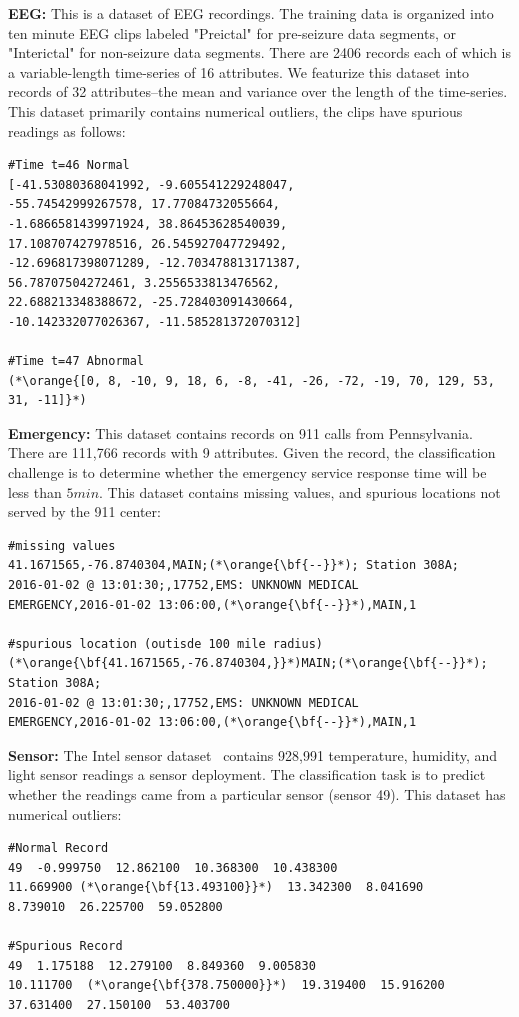 \vspace{0.5em}\noindent\textbf{EEG: } This is a dataset of EEG recordings. 
The training data is organized into ten minute EEG clips labeled "Preictal" for pre-seizure data segments, or "Interictal" for non-seizure data segments. 
There are 2406 records each of which is a variable-length time-series of 16 attributes. We featurize this dataset into records of 32 attributes--the mean and variance over the length of the time-series. 
This dataset primarily contains numerical outliers, the clips have spurious readings as follows:
\begin{lstlisting}
#Time t=46 Normal
[-41.53080368041992, -9.605541229248047, 
-55.74542999267578, 17.77084732055664,
-1.6866581439971924, 38.86453628540039, 
17.108707427978516, 26.545927047729492, 
-12.696817398071289, -12.703478813171387, 
56.78707504272461, 3.2556533813476562, 
22.688213348388672, -25.728403091430664, 
-10.142332077026367, -11.585281372070312]

#Time t=47 Abnormal
(*\orange{[0, 8, -10, 9, 18, 6, -8, -41, -26, -72, -19, 70, 129, 53, 31, -11]}*)
\end{lstlisting}

\vspace{0.5em}\noindent\textbf{Emergency: } This dataset contains records on 911 calls from Pennsylvania. There are 111,766 records with 9 attributes. Given the record, the classification challenge is to determine whether the emergency service response time will be less than $5 min$. This dataset contains missing values, and spurious locations not served by the 911 center:
\begin{lstlisting}
#missing values
41.1671565,-76.8740304,MAIN;(*\orange{\bf{--}}*); Station 308A;
2016-01-02 @ 13:01:30;,17752,EMS: UNKNOWN MEDICAL
EMERGENCY,2016-01-02 13:06:00,(*\orange{\bf{--}}*),MAIN,1

#spurious location (outisde 100 mile radius)
(*\orange{\bf{41.1671565,-76.8740304,}}*)MAIN;(*\orange{\bf{--}}*); Station 308A;
2016-01-02 @ 13:01:30;,17752,EMS: UNKNOWN MEDICAL 
EMERGENCY,2016-01-02 13:06:00,(*\orange{\bf{--}}*),MAIN,1
\end{lstlisting}

\vspace{0.5em}\noindent\textbf{Sensor: } The Intel sensor dataset~\cite{} contains 928,991 temperature, humidity, and light sensor readings a sensor deployment. The classification task is to predict whether the readings came from a particular sensor (sensor 49). This dataset has numerical outliers:
\begin{lstlisting}
#Normal Record
49  -0.999750  12.862100  10.368300  10.438300  
11.669900 (*\orange{\bf{13.493100}}*)  13.342300  8.041690  
8.739010  26.225700  59.052800

#Spurious Record
49  1.175188  12.279100  8.849360  9.005830  
10.111700  (*\orange{\bf{378.750000}}*)  19.319400  15.916200  
37.631400  27.150100  53.403700
\end{lstlisting}

